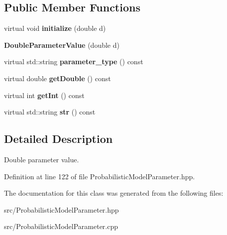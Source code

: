\subsection*{Public Member Functions}
\begin{DoxyCompactItemize}
\item 
\mbox{\label{classtops_1_1DoubleParameterValue_ad5fc3759fdf4b74e261685c97f3cd00f}} 
virtual void {\bfseries initialize} (double d)
\item 
\mbox{\label{classtops_1_1DoubleParameterValue_a9145ee3c39138c923d5b8c02ade984e4}} 
{\bfseries Double\+Parameter\+Value} (double d)
\item 
\mbox{\label{classtops_1_1DoubleParameterValue_a1e41db7d9ed7806522129eb487729605}} 
virtual std\+::string {\bfseries parameter\+\_\+type} () const
\item 
\mbox{\label{classtops_1_1DoubleParameterValue_aae4ea5162cb23c301415f2a67e743582}} 
virtual double {\bfseries get\+Double} () const
\item 
\mbox{\label{classtops_1_1DoubleParameterValue_a41cc4c34c08ee2e409a147bc3889d3d9}} 
virtual int {\bfseries get\+Int} () const
\item 
\mbox{\label{classtops_1_1DoubleParameterValue_af222e0606c80c5bb0724a55046604e77}} 
virtual std\+::string {\bfseries str} () const
\end{DoxyCompactItemize}


\subsection{Detailed Description}
Double parameter value. 

Definition at line 122 of file Probabilistic\+Model\+Parameter.\+hpp.



The documentation for this class was generated from the following files\+:\begin{DoxyCompactItemize}
\item 
src/Probabilistic\+Model\+Parameter.\+hpp\item 
src/Probabilistic\+Model\+Parameter.\+cpp\end{DoxyCompactItemize}
